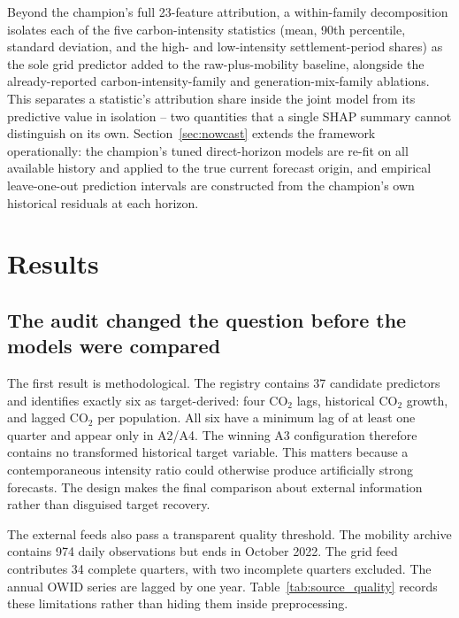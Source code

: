 \documentclass[preprint,12pt]{elsarticle}
\newcommand{\coo}{CO$_2$}
\begin{document}
Beyond the champion's full 23-feature attribution, a within-family decomposition isolates each of the five carbon-intensity statistics (mean, 90th percentile, standard deviation, and the high- and low-intensity settlement-period shares) as the sole grid predictor added to the raw-plus-mobility baseline, alongside the already-reported carbon-intensity-family and generation-mix-family ablations. This separates a statistic's attribution share inside the joint model from its predictive value in isolation -- two quantities that a single SHAP summary cannot distinguish on its own. Section~\ref{sec:nowcast} extends the framework operationally: the champion's tuned direct-horizon models are re-fit on all available history and applied to the true current forecast origin, and empirical leave-one-out prediction intervals are constructed from the champion's own historical residuals at each horizon.

\section{Results}\label{sec:results}

\subsection{The audit changed the question before the models were compared}

The first result is methodological. The registry contains 37 candidate predictors and identifies exactly six as target-derived: four \coo{} lags, historical \coo{} growth, and lagged \coo{} per population. All six have a minimum lag of at least one quarter and appear only in A2/A4. The winning A3 configuration therefore contains no transformed historical target variable. This matters because a contemporaneous intensity ratio could otherwise produce artificially strong forecasts. The design makes the final comparison about external information rather than disguised target recovery.

The external feeds also pass a transparent quality threshold. The mobility archive contains 974 daily observations but ends in October 2022. The grid feed contributes 34 complete quarters, with two incomplete quarters excluded. The annual OWID series are lagged by one year. Table~\ref{tab:source_quality} records these limitations rather than hiding them inside preprocessing.
\end{document}
